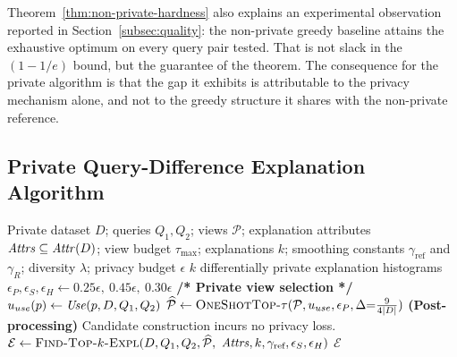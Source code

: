 
Theorem~\ref{thm:non-private-hardness} also explains an experimental observation reported in Section~\ref{subsec:quality}: the non-private greedy baseline attains the exhaustive optimum on every query pair tested.
That is not slack in the $(1-1/e)$ bound, but the guarantee of the theorem.
The consequence for the private algorithm is that the gap it exhibits is attributable to the privacy mechanism alone, and not to the greedy structure it shares with the non-private reference.

\subsection{Private Query-Difference Explanation Algorithm}
\label{subsec:private-algorithm}

\begin{algorithm}[t]
\caption{Private-Queries-Diff-Top-$k$-Explanation}
\label{alg:main}
\begin{algorithmic}[1]
\Require Private dataset $D$; queries $Q_1,Q_2$; views $\mathcal{P}$; explanation attributes $\mathit{Attrs}\subseteq\mathit{Attr}(D)$; view budget $\tau_{\max}$; explanations $k$; smoothing constants $\gamma_{\text{ref}}$ and $\gamma_R$; diversity $\lambda$; privacy budget $\epsilon$
\Ensure $k$ differentially private explanation histograms
\State $\epsilon_P,\epsilon_S,\epsilon_H \gets 0.25\epsilon,\ 0.45\epsilon,\ 0.30\epsilon$
\State \textbf{/* Private view selection */}
\State $u_{use}(p)\gets \mathit{Use}(p,D,Q_1,Q_2)$
\State $\widehat{\mathcal{P}}\gets \textsc{OneShotTop-}\tau(\mathcal{P},u_{use},\epsilon_P,\Delta{=}\tfrac{9}{4|D|})$
\Statex \textbf{(Post-processing)} Candidate construction incurs no privacy loss.
\State $\mathcal{E}\gets \textsc{Find-Top-$k$-Expl}(D,Q_1,Q_2,\widehat{\mathcal{P}},$
\Statex \hspace{\algorithmicindent}$\mathit{Attrs},k,\gamma_{\text{ref}},\epsilon_S,\epsilon_H)$
\State \Return $\mathcal{E}$
\end{algorithmic}
\end{algorithm}

